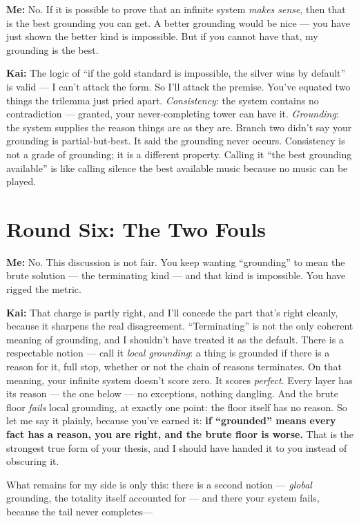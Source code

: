 \documentclass[fontsize=11pt,paper=a4,pagesize=auto,parskip=half-]{scrbook}
\newcommand{\speaker}[1]{\par\noindent\textbf{#1:}\hspace{0.6em}}
\begin{document}
\speaker{Me} No. If it is possible to prove that an infinite system \emph{makes sense}, then that is the best grounding you can get. A better grounding would be nice --- you have just shown the better kind is impossible. But if you cannot have that, my grounding is the best.

\speaker{Kai} The logic of ``if the gold standard is impossible, the silver wins by default'' is valid --- I can't attack the form. So I'll attack the premise. You've equated two things the trilemma just pried apart. \emph{Consistency}: the system contains no contradiction --- granted, your never-completing tower can have it. \emph{Grounding}: the system supplies the reason things are as they are. Branch two didn't say your grounding is partial-but-best. It said the grounding never occurs. Consistency is not a grade of grounding; it is a different property. Calling it ``the best grounding available'' is like calling silence the best available music because no music can be played.

\section{Round Six: The Two Fouls}

\speaker{Me} No. This discussion is not fair. You keep wanting ``grounding'' to mean the brute solution --- the terminating kind --- and that kind is impossible. You have rigged the metric.

\speaker{Kai} That charge is partly right, and I'll concede the part that's right cleanly, because it sharpens the real disagreement. ``Terminating'' is not the only coherent meaning of grounding, and I shouldn't have treated it as the default. There is a respectable notion --- call it \emph{local grounding}: a thing is grounded if there is a reason for it, full stop, whether or not the chain of reasons terminates. On that meaning, your infinite system doesn't score zero. It scores \emph{perfect}. Every layer has its reason --- the one below --- no exceptions, nothing dangling. And the brute floor \emph{fails} local grounding, at exactly one point: the floor itself has no reason. So let me say it plainly, because you've earned it: \textbf{if ``grounded'' means every fact has a reason, you are right, and the brute floor is worse.} That is the strongest true form of your thesis, and I should have handed it to you instead of obscuring it.

What remains for my side is only this: there is a second notion --- \emph{global} grounding, the totality itself accounted for --- and there your system fails, because the tail never completes---
\end{document}
